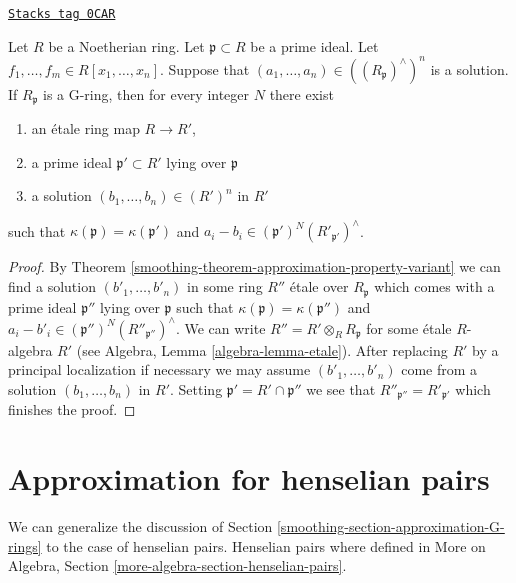 \begin{lemma}
\label{smoothing-lemma-approximation-property-variant}
\href{https://stacks.math.columbia.edu/tag/0CAR}{\texttt{Stacks tag 0CAR}}

Let $R$ be a Noetherian ring. Let $\mathfrak p \subset R$ be a prime ideal. Let
$f_1, \ldots, f_m \in R[x_1, \ldots, x_n]$.
Suppose that $(a_1, \ldots, a_n) \in ((R_\mathfrak p)^\wedge)^n$ is a solution.
If $R_\mathfrak p$ is a G-ring, then for every integer $N$ there exist
\begin{enumerate}
\item an \'etale ring map $R \to R'$,
\item a prime ideal $\mathfrak p' \subset R'$ lying over $\mathfrak p$
\item a solution $(b_1, \ldots, b_n) \in (R')^n$ in $R'$
\end{enumerate}
such that $\kappa(\mathfrak p) = \kappa(\mathfrak p')$ and
$a_i - b_i \in (\mathfrak p')^N(R'_{\mathfrak p'})^\wedge$.
\end{lemma}

\begin{proof}

By Theorem \ref{smoothing-theorem-approximation-property-variant}
we can find a solution $(b'_1, \ldots, b'_n)$ in some ring
$R''$ \'etale over $R_\mathfrak p$ which comes with a
prime ideal $\mathfrak p''$ lying over $\mathfrak p$ such
that $\kappa(\mathfrak p) = \kappa(\mathfrak p'')$ and
$a_i - b'_i \in (\mathfrak p'')^N(R''_{\mathfrak p''})^\wedge$.
We can write
$R'' = R' \otimes_R R_\mathfrak p$ for some \'etale $R$-algebra $R'$
(see Algebra, Lemma \ref{algebra-lemma-etale}). After replacing
$R'$ by a principal localization if necessary we may assume
$(b'_1, \ldots, b'_n)$ come from a solution $(b_1, \ldots, b_n)$
in $R'$. Setting $\mathfrak p' = R' \cap \mathfrak p''$ we
see that $R''_{\mathfrak p''} = R'_{\mathfrak p'}$ which finishes the proof.
\end{proof}

\section{Approximation for henselian pairs}
\label{smoothing-section-approximation-pairs}
We can generalize the discussion of
Section \ref{smoothing-section-approximation-G-rings} to the case of henselian pairs.
Henselian pairs where defined in
More on Algebra, Section \ref{more-algebra-section-henselian-pairs}.

